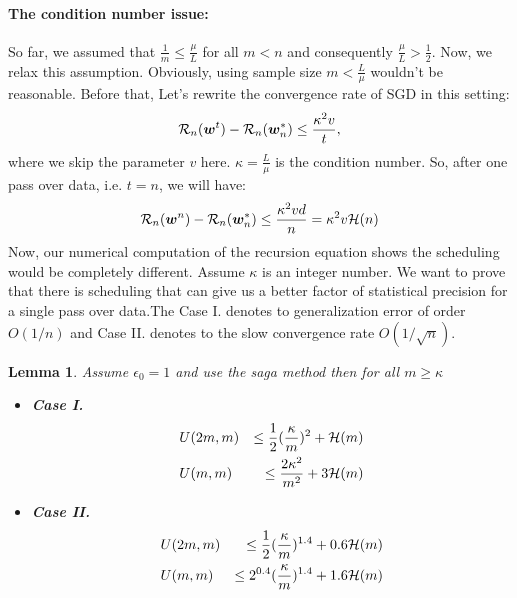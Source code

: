 \documentclass{article}
\newtheorem{lemma}{Lemma}
\newcommand{\wv}{\bm{w}}
\newcommand{\risk}{{\cal R}}
\newcommand{\bound}{{\cal H}}
\begin{document}
\paragraph{The condition number issue:}
So far, we assumed that $\frac{1}{m} \leq \frac{\mu}{L}$ for all $m<n$ and
consequently $\frac{\mu}{L}>\frac{1}{2}$. Now, we relax this assumption.
Obviously, using sample size $m<\frac{L}{\mu}$ wouldn't be reasonable. Before
that, Let's rewrite the convergence rate of SGD in this setting:
\begin{equation*}
	\risk_n(\wv^t) - \risk_n(\wv^*_n) \leq \frac{\kappa^2 v  }{t}, 
\end{equation*}
where we skip the parameter $v$ here. $\kappa = \frac{L}{\mu}$ is the condition
number. So, after one pass over data, i.e. $t = n$, we
will have:
\begin{equation*}
	\risk_n(\wv^n) - \risk_n(\wv^*_n) \leq \frac{\kappa^2 v d }{n} = \kappa^2 v
	\bound(n)
\end{equation*}
Now, our numerical computation of the recursion equation shows the
scheduling would be completely different. Assume $\kappa$ is an integer number. 
We want to prove that there is scheduling that can give us a better factor of
statistical precision for a single pass over data.The Case I. denotes to
generalization error of order $O(1/n)$ and Case II. denotes to the slow
convergence rate $O(1/\sqrt{n})$.
\begin{lemma}
	Assume $\epsilon_0 = 1$ and use the saga method then for all $m \geq \kappa$ \\
	\begin{itemize}
	  \item \textbf{Case I.}
	  \begin{eqnarray*}
		& U(2 m, m ) & \leq \frac{1}{2} (\frac{\kappa}{m})^2 + \bound(m)  \\ 
		& U(m,m) &  \leq \frac{2\kappa^2}{m^2} + 3 \bound(m)
	\end{eqnarray*}
	\item  \textbf{Case II.}
	  \begin{eqnarray*}
		& U(2 m, m ) & \leq \frac{1}{2}(\frac{\kappa}{m})^{1.4} + 0.6 \bound(m)
		\\
		& U(m,m) & \leq 2^{0.4} (\frac{\kappa}{m})^{1.4} + 1.6 \bound(m)
	\end{eqnarray*}
	\end{itemize}
\end{lemma}
\end{document}
